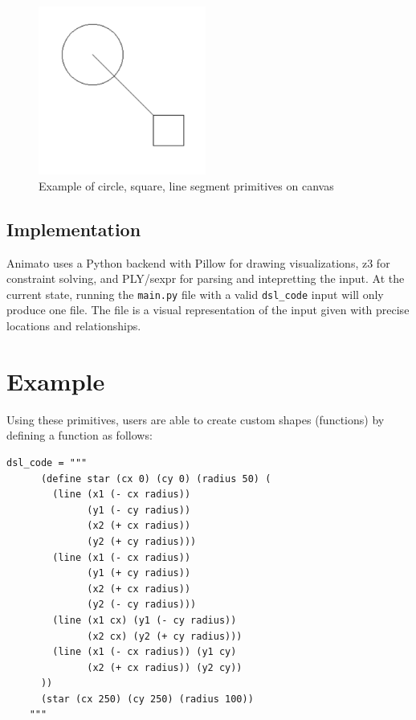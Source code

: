 \documentclass[acmsmall,screen]{acmart}
\begin{document}
\begin{center}
  \begin{figure}[!h]
    \includegraphics[width=0.49\textwidth]{images/primitives.png}
    \caption{Example of circle, square, line segment primitives on canvas}
  \end{figure}
\end{center}

\subsection{Implementation}
Animato uses a Python backend with Pillow for drawing visualizations, z3 for constraint solving, and PLY/sexpr for parsing and intepretting the input.
At the current state, running the \texttt{main.py} file with a valid \texttt{dsl\_code} input will only produce one file.
The file is a visual representation of the input given with precise locations and relationships.

\section{Example}
Using these primitives, users are able to create custom shapes (functions) by defining a function as follows:

\begin{lstlisting}[label=code, caption=Sample custom function definition in Animato]
    dsl_code = """
      (define star (cx 0) (cy 0) (radius 50) (
        (line (x1 (- cx radius))
              (y1 (- cy radius))
              (x2 (+ cx radius))
              (y2 (+ cy radius)))
        (line (x1 (- cx radius))
              (y1 (+ cy radius))
              (x2 (+ cx radius))
              (y2 (- cy radius)))
        (line (x1 cx) (y1 (- cy radius))
              (x2 cx) (y2 (+ cy radius)))
        (line (x1 (- cx radius)) (y1 cy)
              (x2 (+ cx radius)) (y2 cy))
      ))
      (star (cx 250) (cy 250) (radius 100))
    """
\end{lstlisting}
\end{document}

